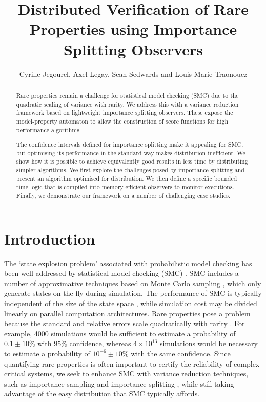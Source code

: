 \documentclass{llncs}
\begin{document}
\title{Distributed Verification of Rare Properties using Importance Splitting
Observers}


\author{Cyrille Jegourel, Axel Legay, Sean Sedwards and Louis-Marie Traonouez}


\maketitle
\begin{abstract}
Rare properties remain a challenge for statistical model checking
(SMC) due to the quadratic scaling of variance with rarity. We address
this with a variance reduction framework based on lightweight importance
splitting observers. These expose the model-property automaton to
allow the construction of score functions for high performance algorithms.

The confidence intervals defined for importance splitting make it
appealing for SMC, but optimising its performance in the standard
way makes distribution inefficient. We show how it is possible to
achieve equivalently good results in less time by distributing simpler
algorithms. We first explore the challenges posed by importance splitting
and present an algorithm optimised for distribution. We then define
a specific bounded time logic that is compiled into memory-efficient
observers to monitor executions. Finally, we demonstrate our framework
on a number of challenging case studies.
\end{abstract}


\section{Introduction}

The `state explosion problem' \cite{ClarkeEmersonAllenSifakis2009}
associated with probabilistic model checking has been well addressed
by statistical model checking (SMC) \cite{YounesKwiatkowskaNormanParker2006}.
SMC includes a number of approximative techniques based on Monte Carlo
sampling \cite{MetropolisUlam1949}, which only generate states on
the fly during simulation. The performance of SMC is typically independent
of the size of the state space \cite{Niederreiter1992}, while simulation
cost may be divided linearly on parallel computation architectures.
Rare properties pose a problem because the standard and relative errors
scale quadratically with rarity \cite{HammersleyHandscomb1964,RubinoTuffin2009}.
For example, 4000 simulations would be sufficient to estimate a probability
of $0.1\pm10\%$ with $95\%$ confidence, whereas $4\times10^{13}$
simulations would be necessary to estimate a probability of $10^{-6}\pm10\%$
with the same confidence. Since quantifying rare properties is often
important to certify the reliability of complex critical systems,
we seek to enhance SMC with variance reduction techniques, such as
importance sampling and importance splitting \cite{KahnHarris1951,HammersleyHandscomb1964,RubinoTuffin2009},
while still taking advantage of the easy distribution that SMC typically
affords.
\end{document}
